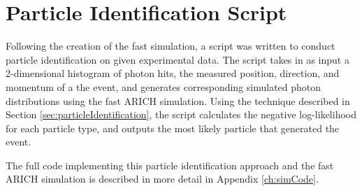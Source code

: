 
\section{Particle Identification Script}
Following the creation of the fast simulation, a script was written to conduct particle identification on given experimental data.
The script takes in as input a 2-dimensional histogram of photon hits, the measured position, direction, and momentum of a the event, and generates corresponding simulated photon distributions using the fast ARICH simulation.
Using the technique described in Section \ref{sec:particleIdentification}, the script calculates the negative log-likelihood for each particle type, and outputs the most likely particle that generated the event.

The full code implementing this particle identification approach and the fast ARICH simulation is described in more detail in Appendix \ref{ch:simCode}.

\endinput



\section{Comparison with Geant4} 
In this section, I will compare the simulated photon distribution between my simulation and the full Geant4 simulation.
They will be compared on a number of metrics, including the number of photons detected in the photon ring, and the level of background photons (determined by taking the ratio of histograms simulated by my simulation and by Geant4). This work is in progress: comparisons have been done, but it is still necessary to more accurately quantify the differences between the two simulations and display these results. I will describe the differences between my simulation and the full Geant4 simulation, and make the claim that my simulation contains enough of the necessary physics to simulate Cherenkov photons with sufficient accuracy for our purposes.

\section{Mirror}
In order to 


Any text after an \endinput is ignored.
You could put scraps here or things in progress.
